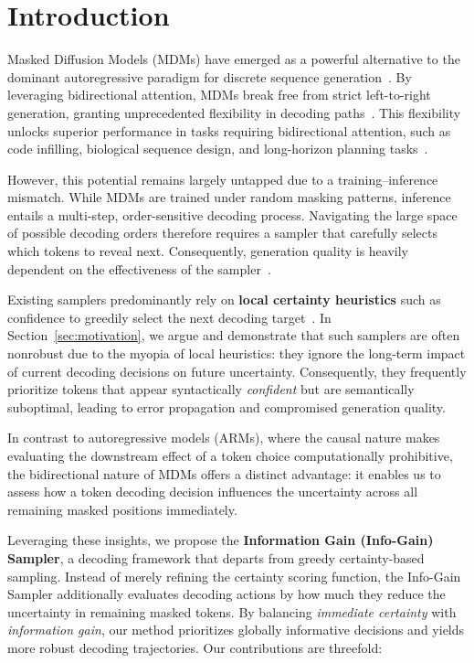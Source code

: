 \section{Introduction}

Masked Diffusion Models (MDMs) have emerged as a powerful alternative to the dominant autoregressive paradigm for discrete sequence generation~\cite{austin2021structured, lou2024discrete,nie2025large}. By leveraging bidirectional attention, MDMs break free from strict left-to-right generation, granting unprecedented flexibility in decoding paths~\cite{rombach2022high}. This flexibility unlocks superior performance in tasks requiring bidirectional attention, such as code infilling, biological sequence design, and long-horizon planning tasks~\cite{ye2025dream, gong2024scaling,ye2024beyond}.

However, this potential remains largely untapped due to a training--inference mismatch. While MDMs are trained under random masking patterns, inference entails a multi-step, order-sensitive decoding process. Navigating the large space of possible decoding orders therefore requires a sampler that carefully selects which tokens to reveal next. Consequently, generation quality is heavily dependent on the effectiveness of the sampler~\cite{kim2025train}.

Existing samplers predominantly rely on \textbf{local certainty heuristics} such as confidence to greedily select the next decoding target~\cite{chang2022maskgit, ye2025dream, huang2025pc, kim2025train}. In Section~\ref{sec:motivation}, we argue and demonstrate that such samplers are often nonrobust due to the myopia of local heuristics: they ignore the long-term impact of current decoding decisions on future uncertainty. Consequently, they frequently prioritize tokens that appear syntactically \textit{confident} but are semantically suboptimal, leading to error propagation and compromised generation quality.


In contrast to autoregressive models (ARMs), where the causal nature makes evaluating the downstream effect of a token choice computationally prohibitive, the bidirectional nature of MDMs offers a distinct advantage: it enables us to assess how a token decoding decision influences the uncertainty across all remaining masked positions immediately.

Leveraging these insights, we propose the \textbf{Information Gain (Info-Gain) Sampler}, a decoding framework that departs from greedy certainty-based sampling. Instead of merely refining the certainty scoring function, the Info-Gain Sampler additionally evaluates decoding actions by how much they reduce the uncertainty in remaining masked tokens. By balancing \textit{immediate certainty} with \textit{information gain}, our method prioritizes globally informative decisions and yields more robust decoding trajectories. Our contributions are threefold:

